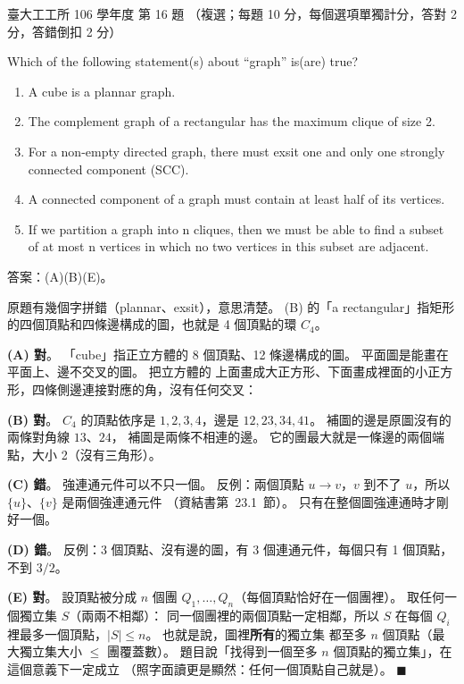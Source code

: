 \begin{pastexam}[label={px:ntu-106-ie-ds-16}]{臺大工工所 106 學年度 第 16 題}
（複選；每題 10 分，每個選項單獨計分，答對 2 分，答錯倒扣 2 分）

Which of the following statement(s) about ``graph'' is(are) true?
\begin{enumerate}[label=(\Alph*),nosep]
\item A cube is a plannar graph.
\item The complement graph of a rectangular has the maximum clique of size 2.
\item For a non-empty directed graph, there must exsit one and only one strongly connected component (SCC).
\item A connected component of a graph must contain at least half of its vertices.
\item If we partition a graph into n cliques, then we must be able to find a subset of at most n vertices in
which no two vertices in this subset are adjacent.
\end{enumerate}
\end{pastexam}

\begin{pastsoln}
答案：(A)(B)(E)。

原題有幾個字拼錯（plannar、exsit），意思清楚。 (B) 的「a rectangular」指矩形的四個頂點和四條邊構成的圖，也就是
4 個頂點的環 $C_4$。

\textbf{(A) 對}。 「cube」指正立方體的 8 個頂點、12 條邊構成的圖。 平面圖是能畫在平面上、邊不交叉的圖。 把立方體的
上面畫成大正方形、下面畫成裡面的小正方形，四條側邊連接對應的角，沒有任何交叉：
\begin{center}
\end{center}

\textbf{(B) 對}。 $C_4$ 的頂點依序是 $1, 2, 3, 4$，邊是 $12, 23, 34, 41$。 補圖的邊是原圖沒有的兩條對角線 $13$、$24$，
補圖是兩條不相連的邊。 它的團最大就是一條邊的兩個端點，大小 2（沒有三角形）。

\textbf{(C) 錯}。 強連通元件可以不只一個。 反例：兩個頂點 $u \to v$，$v$ 到不了 $u$，所以 $\{u\}$、$\{v\}$ 是兩個強連通元件
（資結書第~23.1~節）。 只有在整個圖強連通時才剛好一個。

\textbf{(D) 錯}。 反例：3 個頂點、沒有邊的圖，有 3 個連通元件，每個只有 1 個頂點，不到 $3/2$。

\textbf{(E) 對}。 設頂點被分成 $n$ 個團 $Q_1, \ldots, Q_n$（每個頂點恰好在一個團裡）。 取任何一個獨立集 $S$（兩兩不相鄰）：
同一個團裡的兩個頂點一定相鄰，所以 $S$ 在每個 $Q_i$ 裡最多一個頂點，$|S| \le n$。 也就是說，圖裡\textbf{所有}的獨立集
都至多 $n$ 個頂點（最大獨立集大小 $\le$ 團覆蓋數）。 題目說「找得到一個至多 $n$ 個頂點的獨立集」，在這個意義下一定成立
（照字面讀更是顯然：任何一個頂點自己就是）。 \hfill$\blacksquare$
\end{pastsoln}
